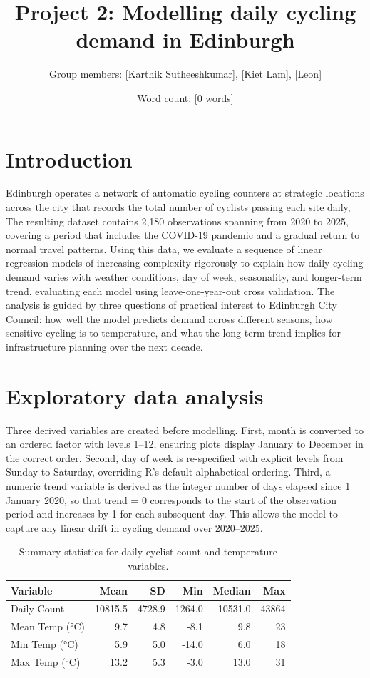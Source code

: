 \documentclass[
]{article}
\title{Project 2: Modelling daily cycling demand in Edinburgh}
\author{Group members: {[}Karthik Sutheeshkumar{]}, {[}Kiet Lam{]}, {[}Leon{]}}
\date{Word count: {[}0 words{]}}
\begin{document}
\maketitle

\section{Introduction}\label{introduction}

Edinburgh operates a network of automatic cycling counters at strategic locations across the city that records the total number of cyclists passing each site daily, The resulting dataset contains 2,180 observations spanning from 2020 to 2025, covering a period that includes the COVID-19 pandemic and a gradual return to normal travel patterns. Using this data, we evaluate a sequence of linear regression models of increasing complexity rigorously to explain how daily cycling demand varies with weather conditions, day of week, seasonality, and longer-term trend, evaluating each model using leave-one-year-out cross validation. The analysis is guided by three questions of practical interest to Edinburgh City Council: how well the model predicts demand across different seasons, how sensitive cycling is to temperature, and what the long-term trend implies for infrastructure planning over the next decade.

\section{Exploratory data analysis}\label{exploratory-data-analysis}

Three derived variables are created before modelling. First, month is converted
to an ordered factor with levels 1--12, ensuring plots display January to December
in the correct order. Second, day of week is re-specified with explicit levels
from Sunday to Saturday, overriding R's default alphabetical ordering. Third,
a numeric trend variable is derived as the integer number of days elapsed since
1 January 2020, so that trend = 0 corresponds to the start of the observation
period and increases by 1 for each subsequent day. This allows the model to
capture any linear drift in cycling demand over 2020--2025.

\begin{table}

\caption{\label{tab:unnamed-chunk-1}Summary statistics for daily cyclist count and temperature variables.}
\centering
\begin{tabular}[t]{lrrrrr}
\toprule
Variable & Mean & SD & Min & Median & Max\\
\midrule
Daily Count & 10815.5 & 4728.9 & 1264.0 & 10531.0 & 43864\\
Mean Temp (°C) & 9.7 & 4.8 & -8.1 & 9.8 & 23\\
Min Temp (°C) & 5.9 & 5.0 & -14.0 & 6.0 & 18\\
Max Temp (°C) & 13.2 & 5.3 & -3.0 & 13.0 & 31\\
\bottomrule
\end{tabular}
\end{table}
\end{document}
